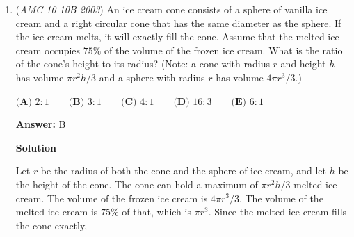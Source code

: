 \begin{enumerate}
 



\textbf{Solution 2}

Let $m$ denote the number of main courses needed to meet the requirement. Then the number of dinners available is $3\cdot m \cdot 2m = 6m^2$. Thus $m^2$ must be at least $365/6 \approx 61$. Since $7^2 = 49<61<64 = 8^2$, $\boxed{8}$ main courses is enough, but 7 is not. The smallest integer value that satisfies this is $\boxed{\textbf{(E)}\ 8}$.

 


 



\textbf{Solution 3}

Let $x$ be the number of main courses and let $2x$ be the number of appetizers.Since there are 3 desserts, the number of possible dinner choices would be $2x \cdot x \cdot 3 = 6x^2$ for any number $x$. Since a year has $365$ days, we can assume that:
 \begin{align*} 6x^2 \ge 365 \end{align*}

 \begin{align*} x^2 \ge 61 \end{align*}

 \begin{align*} x \ge 7.8 \end{align*}
The least option that is greater than $7.8$ is $8$, so the answer is $\boxed{\textbf{(E)}\ 8}$.

 


	\item (\textit{AMC 10 10B 2003}) An ice cream cone consists of a sphere of vanilla ice cream and a right circular cone that has the same diameter as the sphere. If the ice cream melts, it will exactly fill the cone. Assume that the melted ice cream occupies $75\%$ of the volume of the frozen ice cream. What is the ratio of the cone's height to its radius? (Note: a cone with radius $r$ and height $h$ has volume $\pi r^2 h / 3$ and a sphere with radius $r$ has volume $4 \pi r^3 / 3$.)


 $\textbf{(A) } 2:1 \qquad\textbf{(B) } 3:1 \qquad\textbf{(C) } 4:1 \qquad\textbf{(D) } 16:3 \qquad\textbf{(E) } 6:1$

 \textbf{Answer: }B



\textbf{Solution}

Let $r$ be the radius of both the cone and the sphere of ice cream, and let $h$ be the height of the cone. The cone can hold a maximum of $\pi r^2h/3$ melted ice cream. The volume of the frozen ice cream is $4\pi r^3/3.$ The volume of the melted ice cream is $75 \%$ of that, which is $\pi r^3.$ Since the melted ice cream fills the cone exactly,


\end{enumerate}
